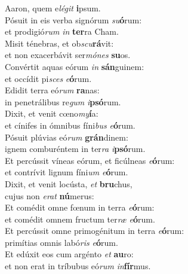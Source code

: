 \oddverse Aaron, quem e\textit{lé}\textit{git} \textbf{i}psum.\\
\evenverse Pósuit in eis verba signórum \textit{su}\textbf{ó}rum:~\*\\
\evenverse et prodigió\textit{rum} \textit{in} \textbf{ter}ra Cham.\\
\oddverse Misit ténebras, et ob\textit{scu}\textbf{rá}vit:~\*\\
\oddverse et non exacerbávit ser\textit{mó}\textit{nes} \textbf{su}os.\\
\evenverse Convértit aquas eórum \textit{in} \textbf{sán}guinem:~\*\\
\evenverse et occídit pi\textit{sces} \textit{e}\textbf{ó}rum.\\
\oddverse Edidit terra eó\textit{rum} \textbf{ra}nas:~\*\\
\oddverse in penetrálibus re\textit{gum} \textit{i}\textbf{psó}rum.\\
\evenverse Dixit, et venit cœno\textit{my}\textbf{í}a:~\*\\
\evenverse et cínifes in ómnibus fíni\textit{bus} \textit{e}\textbf{ó}rum.\\
\oddverse Pósuit plúvias eó\textit{rum} \textbf{grán}dinem:~\*\\
\oddverse ignem comburéntem in ter\textit{ra} \textit{i}\textbf{psó}rum.\\
\evenverse Et percússit víneas eórum, et ficúlneas \textit{e}\textbf{ó}rum:~\*\\
\evenverse et contrívit lignum fíni\textit{um} \textit{e}\textbf{ó}rum.\\
\oddverse Dixit, et venit locústa, \textit{et} \textbf{bru}chus,~\*\\
\oddverse cujus non \textit{e}\textit{rat} \textbf{nú}merus:\\
\evenverse Et comédit omne fœnum in terra \textit{e}\textbf{ó}rum:~\*\\
\evenverse et comédit omnem fructum ter\textit{ræ} \textit{e}\textbf{ó}rum.\\
\oddverse Et percússit omne primogénitum in terra \textit{e}\textbf{ó}rum:~\*\\
\oddverse primítias omnis labó\textit{ris} \textit{e}\textbf{ó}rum.\\
\evenverse Et edúxit eos cum argénto \textit{et} \textbf{au}ro:~\*\\
\evenverse et non erat in tríbubus eó\textit{rum} \textit{in}\textbf{fír}mus.\\
